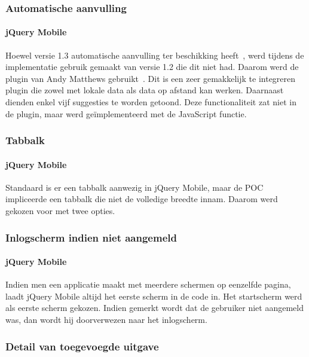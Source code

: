 \subsubsection{Automatische aanvulling}

\paragraph{jQuery Mobile} 
Hoewel versie 1.3 automatische aanvulling ter beschikking heeft~\cite{JQuery2013c}, werd tijdens de implementatie gebruik gemaakt van versie 1.2 die dit niet had. 
Daarom werd de plugin van Andy Matthews gebruikt~\cite{Matthews2013}. 
Dit is een zeer gemakkelijk te integreren plugin die zowel met lokale data als data op afstand kan werken. 
Daarnaast dienden enkel vijf suggesties te worden getoond. 
Deze functionaliteit zat niet in de plugin, maar werd geïmplementeerd met de JavaScript  functie.

\subsubsection{Tabbalk}

\paragraph{jQuery Mobile} 
Standaard is er een tabbalk aanwezig in jQuery Mobile, maar de POC impliceerde een tabbalk die niet de volledige breedte innam.
Daarom werd gekozen voor  met twee opties.

\subsubsection{Inlogscherm indien niet aangemeld}

\paragraph{jQuery Mobile} 
Indien men een applicatie maakt met meerdere schermen op eenzelfde pagina, laadt jQuery Mobile altijd het eerste scherm in de code in.
Het startscherm werd als eerste scherm gekozen.
Indien gemerkt wordt dat de gebruiker niet aangemeld was, dan wordt hij doorverwezen naar het inlogscherm.

\subsubsection{Detail van toegevoegde uitgave}

